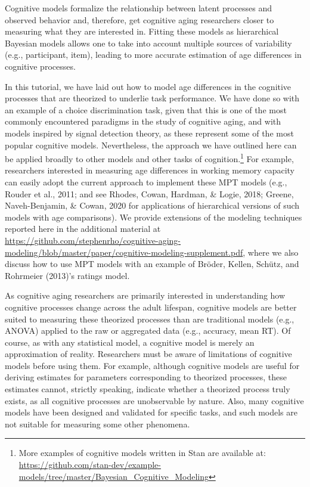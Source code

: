 \documentclass[
  english,
  ,man,floatsintext]{apa6}
\begin{document}
Cognitive models formalize the relationship between latent processes and observed behavior and, therefore, get cognitive aging researchers closer to measuring what they are interested in. Fitting these models as hierarchical Bayesian models allows one to take into account multiple sources of variability (e.g., participant, item), leading to more accurate estimation of age differences in cognitive processes.

In this tutorial, we have laid out how to model age differences in the cognitive processes that are theorized to underlie task performance. We have done so with an example of a choice discrimination task, given that this is one of the most commonly encountered paradigms in the study of cognitive aging, and with models inspired by signal detection theory, as these represent some of the most popular cognitive models. Nevertheless, the approach we have outlined here can be applied broadly to other models and other tasks of cognition.\footnote{More examples of cognitive models written in Stan are available at: \url{https://github.com/stan-dev/example-models/tree/master/Bayesian_Cognitive_Modeling}} For example, researchers interested in measuring age differences in working memory capacity can easily adopt the current approach to implement these MPT models (e.g., Rouder et al., 2011; and see Rhodes, Cowan, Hardman, \& Logie, 2018; Greene, Naveh-Benjamin, \& Cowan, 2020 for applications of hierarchical versions of such models with age comparisons). We provide extensions of the modeling techniques reported here in the additional material at \url{https://github.com/stephenrho/cognitive-aging-modeling/blob/master/paper/cognitive-modeling-supplement.pdf}, where we also discuss how to use MPT models with an example of Bröder, Kellen, Schütz, and Rohrmeier (2013)'s ratings model.

As cognitive aging researchers are primarily interested in understanding how cognitive processes change across the adult lifespan, cognitive models are better suited to measuring these theorized processes than are traditional models (e.g., ANOVA) applied to the raw or aggregated data (e.g., accuracy, mean RT). Of course, as with any statistical model, a cognitive model is merely an approximation of reality. Researchers must be aware of limitations of cognitive models before using them. For example, although cognitive models are useful for deriving estimates for parameters corresponding to theorized processes, these estimates cannot, strictly speaking, indicate whether a theorized process truly exists, as all cognitive processes are unobservable by nature. Also, many cognitive models have been designed and validated for specific tasks, and such models are not suitable for measuring some other phenomena.
\end{document}
